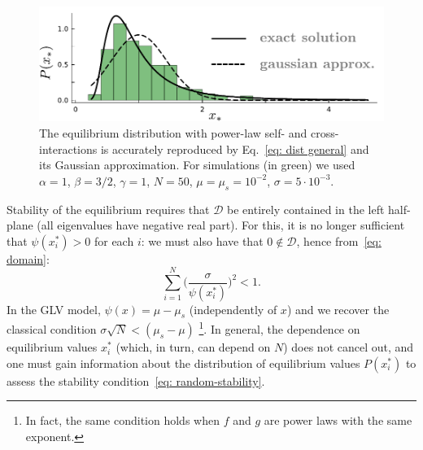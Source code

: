 \begin{figure}[t!]
    \includegraphics[width=.45\textwidth]{figs/cavity.pdf}
    \caption{The equilibrium distribution with power-law self- and cross-interactions is accurately reproduced by 
    Eq.~\eqref{eq: dist general} and its Gaussian approximation.
    For simulations (in green) we used $\alpha=1$, $\beta=3/2$,
    $\gamma=1$, $N=50$, $\mu=\mu_s=10^{-2}$, $\sigma=5\cdot 10^{-3}$.}
    \label{fig: cavity sol.}
\end{figure}

Stability of the equilibrium requires that $\mathcal{D}$ be entirely contained in the left half-plane (all eigenvalues have negative real part). For this, it is no longer sufficient that $\psi(x_i^*) > 0$ for each $i$: we must also have that $0\notin \mathcal{D}$, hence from~\eqref{eq: domain}:
\begin{equation}
    \sum_{i=1}^N \Big(\frac{\sigma}{\psi(x_i^*)}\Big)^{2}
    < 1.
    \label{eq: random-stability}
\end{equation}
In the GLV model, $\psi(x) = \mu-\mu_s$ (independently of $x$) and we recover the classical condition $\sigma\sqrt{N} < (\mu_s-\mu)$ \footnote{In fact, the same condition holds when $f$ and $g$ are power laws with the same exponent.}. In general, the dependence on equilibrium values $x_i^*$ (which, in turn, can depend on $N$) does not cancel out, and one must gain information about the distribution of equilibrium values $P(x_i^*)$ to assess the stability condition~\eqref{eq: random-stability}.